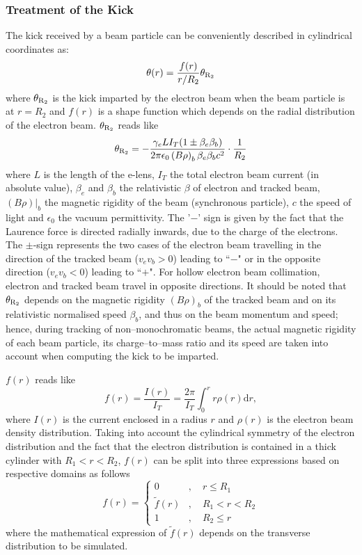 \documentclass[english]{article}
\begin{document}
\subsubsection{Treatment of the Kick}
The kick received by a beam particle can be conveniently described in cylindrical coordinates as:
\begin{equation}
  \theta(r)=\frac{f(r)}{r/R_2} \theta_{\rm R_2}
  \label{elense:eqn:0}
\end{equation}
where $\theta_{\rm R_2}$ is the kick imparted by the electron beam when the beam particle
is at $r=R_2$ and $f(r)$ is a shape function which depends on the radial distribution of the
electron beam.
$\theta_{\rm R_2}$ reads like
\begin{equation}
\theta_{\rm R_2} = -\frac{\gamma_eLI_T(1\pm\beta_e\beta_b)}{2\pi\epsilon_0  \left(B\rho\right)_b\beta_e\beta_b c^2}\cdot\frac{1}{R_2}
\label{elense:eqn:6}
\end{equation}
where $L$ is the length of the e-lens, $I_T$ the total electron beam current (in absolute value), $\beta_{e}$ and $\beta_{b}$ the relativistic $\beta$ of electron and tracked beam, $(B\rho)|_b$ the magnetic rigidity of the beam (synchronous particle), $c$ the speed of light and $\epsilon_0$ the vacuum permittivity. The '$-$' sign is given by the fact that the Laurence force is directed radially inwards, due to the charge of the electrons. The $\pm$-sign represents the two cases of the electron beam travelling in the direction of the tracked beam ($v_e v_b>0$) leading to ``$-$" or in the opposite direction ($v_e v_b<0$) leading to ``$+$". For hollow electron beam collimation, electron and tracked beam travel in opposite directions. It should be noted that $\theta_{\rm R_2}$ depends on the magnetic rigidity $(B\rho)_b$ of the tracked beam and on its relativistic normalised speed $\beta_b$, and thus on the beam momentum and speed; hence, during tracking of non--monochromatic beams, the actual magnetic rigidity of each beam particle, its charge--to--mass ratio and its speed are taken into account when computing the kick to be imparted.

$f(r)$ reads like
\begin{equation}
  f(r) = \frac{I(r)}{I_T}=\frac{2\pi}{I_T}\int_{0}^r r\rho(r) \mathrm{d}r,
  \label{elense:eqn:1}
\end{equation}
where $I(r)$ is the current enclosed in a radius
$r$ and $\rho(r)$ is the electron beam density distribution. Taking into account the
cylindrical symmetry of the electron distribution and the fact that the electron
distribution is contained in a thick cylinder with $R_1<r<R_2$,
$f(r)$ can be split into
three expressions based on respective domains as follows
\begin{equation}
f(r) =
\begin{cases} 0 &,\quad r \leq R_1\\
\tilde f(r) &,\quad R_1 < r < R_2\\
1 &,\quad R_2 \leq r
\end{cases}
\label{elense:eqn:5}
\end{equation}
where the mathematical expression of $\tilde f(r)$ depends on the transverse
distribution to be simulated.
\end{document}

